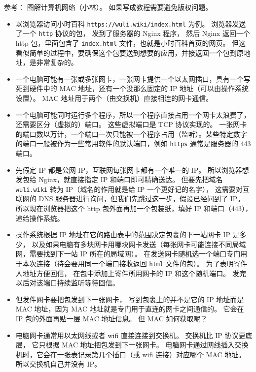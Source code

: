 
\begin{issues}
\issueDraft
\end{issues}

参考： 图解计算机网络（小林）。 如果写成教程需要避免版权问题。

\begin{itemize}
\item 以浏览器访问小时百科 \verb`https://wuli.wiki/index.html` 为例。 浏览器发送了一个 \verb`http` 协议的包， 发到了服务器的 Nginx 程序， 然后 Nginx 返回一个 http 包，里面包含了 \verb`index.html` 文件，也就是小时百科首页的网页。 但这看似简单的过程中，要确保这个包要送到想要的应用，并接返回一个包到原地址，是非常复杂的。
\item 一个电脑可能有一张或多张网卡，一张网卡提供一个以太网插口，具有一个写死到硬件中的 MAC 地址，还有一个没那么固定的 IP 地址（可以由操作系统设置）。 MAC 地址用于两个（由交换机）直接相连的网卡通信。
\item 一个电脑可能同时运行多个程序，所以一个程序直接占用一个网卡太浪费了，还需要区分（虚拟的）端口。 这些虚拟端口是 TCP 协议实现的。 一张网卡的端口数以万计，一个端口一次只能被一个程序占用（监听）。某些特定数字的端口一般被作为一些常用软件的默认端口，例如 \verb`https` 通常是服务器的 443 端口。
\item 先假定 IP 都是公网 IP，互联网每张网卡都有一个唯一的 IP。 所以浏览器想发包给 Nginx，就直接指定 IP 和端口即可精确送达。 但要先把域名 \verb`wuli.wiki` 转为 IP（域名的作用就是给 IP 一个更好记的名字）， 这需要对互联网的 DNS 服务器进行询问，但我们先跳过这一步，假设已经问到了 IP。 所以现在浏览器把这个 http 包外面再加一个包装纸，填好 IP 和端口（443），递给操作系统。
\item 操作系统根据 IP 地址在它的路由表中的范围决定包裹的下一站网卡 IP 是多少， 以及如果电脑有多块网卡用哪块网卡发送（每张网卡可能连接不同局域网，需要找到下一站 IP 所在的局域网）。 在发送网卡随机选一个端口专门用于本次连接（待会要用同一个端口接收返回 \verb`html` 文件的包）。 为了表明寄件人地址方便回信， 在包中添加上寄件所用网卡的 IP 和这个随机端口。 发完以后对该端口持续监听等待回信。
\item 但发件网卡要把包发到下一张网卡， 写到包裹上的并不是它的 IP 地址而是 MAC 地址，因为 MAC 地址就是专门用于直连的网卡之间通信的。 它会在 IP 包的外面再贴一层 MAC 地址信息。 但 MAC 如何获取呢？
\item 电脑网卡通常用以太网线或者 wifi 直接连接到交换机。 交换机比 IP 协议更底层， 它只根据 MAC 地址把包发到下一张网卡。 电脑网卡通过网线插入交换机时，它会在一张表记录第几个插口（或 wifi 连接）对应哪个 MAC 地址。 所以交换机自己并没有 IP。

\end{itemize}
